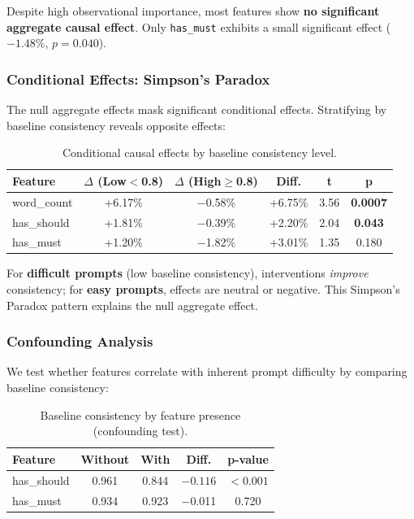 Despite high observational importance, most features show \textbf{no significant aggregate causal effect}. Only \texttt{has\_must} exhibits a small significant effect ($-1.48\%$, $p=0.040$).

\subsubsection{Conditional Effects: Simpson's Paradox}

The null aggregate effects mask significant conditional effects. Stratifying by baseline consistency reveals opposite effects:

\begin{table}[h]
\centering
\caption{Conditional causal effects by baseline consistency level.}
\label{tab:causal_conditional}
\begin{tabular}{lccccc}
\toprule
Feature & $\Delta$ (Low$<$0.8) & $\Delta$ (High$\geq$0.8) & Diff. & t & p \\
\midrule
word\_count & +6.17\% & $-$0.58\% & +6.75\% & 3.56 & \textbf{0.0007} \\
has\_should & +1.81\% & $-$0.39\% & +2.20\% & 2.04 & \textbf{0.043} \\
has\_must & +1.20\% & $-$1.82\% & +3.01\% & 1.35 & 0.180 \\
\bottomrule
\end{tabular}
\end{table}

For \textbf{difficult prompts} (low baseline consistency), interventions \textit{improve} consistency; for \textbf{easy prompts}, effects are neutral or negative. This Simpson's Paradox pattern explains the null aggregate effect.

\subsubsection{Confounding Analysis}

We test whether features correlate with inherent prompt difficulty by comparing baseline consistency:

\begin{table}[h]
\centering
\caption{Baseline consistency by feature presence (confounding test).}
\label{tab:confounding}
\begin{tabular}{lcccc}
\toprule
Feature & Without & With & Diff. & p-value \\
\midrule
has\_should & 0.961 & 0.844 & $\mathbf{-0.116}$ & $\mathbf{<0.001}$ \\
has\_must & 0.934 & 0.923 & $-$0.011 & 0.720 \\
\bottomrule
\end{tabular}
\end{table}

